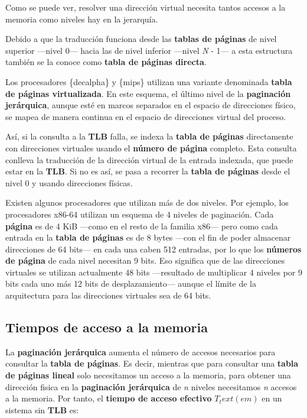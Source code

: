 Como se puede ver, resolver una dirección virtual necesita tantos
accesos a la memoria como niveles hay en la jerarquía.

Debido a que la traducción funciona desde las \textbf{tablas de páginas}
de nivel superior ---nivel 0--- hacia las de nivel inferior ---nivel
\emph{N} - 1--- a esta estructura también se la conoce como
\textbf{tabla de páginas directa}{}.

Los procesadores \{decalpha\} y \{mips\} utilizan una variante
denominada \textbf{tabla de páginas virtualizada}{}. En este esquema, el
último nivel de la \textbf{paginación jerárquica}, aunque esté en marcos
separados en el espacio de direcciones físico, se mapea de manera
continua en el espacio de direcciones virtual del proceso.

Así, si la consulta a la \textbf{TLB} falla, se indexa la \textbf{tabla
de páginas} directamente con direcciones virtuales usando el
\textbf{número de página} completo. Esta consulta conlleva la traducción
de la dirección virtual de la entrada indexada, que puede estar en la
\textbf{TLB}. Si no es así, se pasa a recorrer la \textbf{tabla de
páginas} desde el nivel 0 y usando direcciones físicas.

Existen algunos procesadores que utilizan más de dos niveles. Por
ejemplo, los procesadores x86-64 utilizan un esquema de 4 niveles de
paginación. Cada \textbf{página} es de 4 KiB ---como en el resto de la
familia x86--- pero como cada entrada en la \textbf{tabla de páginas} es
de 8 bytes ---con el fin de poder almacenar direcciones de 64 bits--- en
cada una caben 512 entradas, por lo que los \textbf{números de página}
de cada nivel necesitan 9 bits. Eso significa que de las direcciones
virtuales se utilizan actualmente 48 bits ---resultado de multiplicar 4
niveles por 9 bits cada uno más 12 bits de desplazamiento--- aunque el
límite de la arquitectura para las direcciones virtuales sea de 64 bits.

\subsection{Tiempos de acceso a la
memoria}\label{_tiempos_de_acceso_a_la_memoria_2}

La \textbf{paginación jerárquica} aumenta el número de accesos
necesarios para consultar la \textbf{tabla de páginas}. Es decir,
mientras que para consultar una \textbf{tabla de páginas lineal} solo
necesitamos un acceso a la memoria, para obtener una dirección fisica en
la \textbf{paginación jerárquica} de \emph{n} niveles necesitamos
\emph{n} accesos a la memoria. Por tanto, el \textbf{tiempo de acceso
efectivo} \(T_text(em)\) en un sistema sin \textbf{TLB} es:

